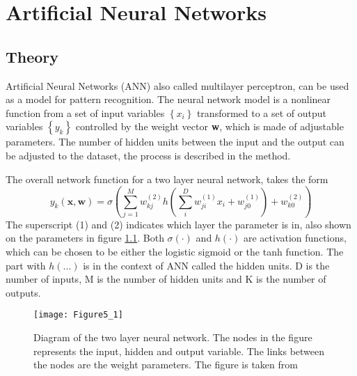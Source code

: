 \chapter{Artificial Neural Networks}

\section{Theory}
Artificial Neural Networks (ANN) also called multilayer perceptron, can be used as a model for pattern recognition. 
The neural network model is a nonlinear function from a set of input variables $ \left\lbrace x_i \right\rbrace  $ transformed to a set of output variables $ \left\lbrace y_k \right\rbrace  $ controlled by the weight vector \textbf{w}, which is made of adjustable parameters.
The number of hidden units between the input and the output can be adjusted to the dataset, the process is described in the method.

The overall network function for a two layer neural network, takes the form
\begin{equation}
y_k(\mathbf{x},\mathbf{w}) = \sigma \left( \sum_{j=1}^{M} w_{kj}^{(2)} h\left( \sum_{i}^{D} w_{ji}^{(1)} x_i + w_{j0}^{(1)} \right) + w_{k0}^{(2)} \right) 
\label{eq:ANN_overall}
\end{equation}
The superscript (1) and (2) indicates which layer the parameter is in, also shown on the parameters in figure \ref{fig:ANN_fig_theory}. 
Both $ \sigma(\cdot) $ and $ h(\cdot) $ are activation functions, which can be chosen to be either the logistic sigmoid or the tanh function.
The part with $ h(...) $ is in the context of ANN called the hidden units. 
D is the number of inputs, M is the number of hidden units and K is the number of outputs.


  
\begin{figure}[H]
\centering
\texttt{[image: Figure5\_1]}
\caption{Diagram of the two layer neural network. The nodes in the figure represents the input, hidden and output variable. The links between the nodes are the weight parameters. The figure is taken from } 
\label{fig:ANN_fig_theory}
\end{figure}

